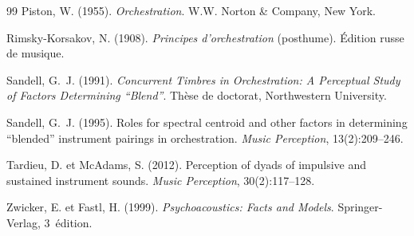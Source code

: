 \documentclass[12pt,a4paper]{article}
\begin{document}
\begin{thebibliography}{99}
Piston, W. (1955).
\newblock \emph{Orchestration}.
\newblock W.W. Norton \& Company, New York.

Rimsky-Korsakov, N. (1908).
\newblock \emph{Principes d'orchestration} (posthume).
\newblock Édition russe de musique.

Sandell, G.~J. (1991).
\newblock \emph{Concurrent Timbres in Orchestration: A Perceptual Study of
  Factors Determining ``Blend''}.
\newblock Thèse de doctorat, Northwestern University.

Sandell, G.~J. (1995).
\newblock Roles for spectral centroid and other factors in determining
  ``blended'' instrument pairings in orchestration.
\newblock \emph{Music Perception}, 13(2):209--246.

Tardieu, D. et McAdams, S. (2012).
\newblock Perception of dyads of impulsive and sustained instrument sounds.
\newblock \emph{Music Perception}, 30(2):117--128.

Zwicker, E. et Fastl, H. (1999).
\newblock \emph{Psychoacoustics: Facts and Models}.
\newblock Springer-Verlag, 3\ieme~édition.

\end{thebibliography}
\end{document}
